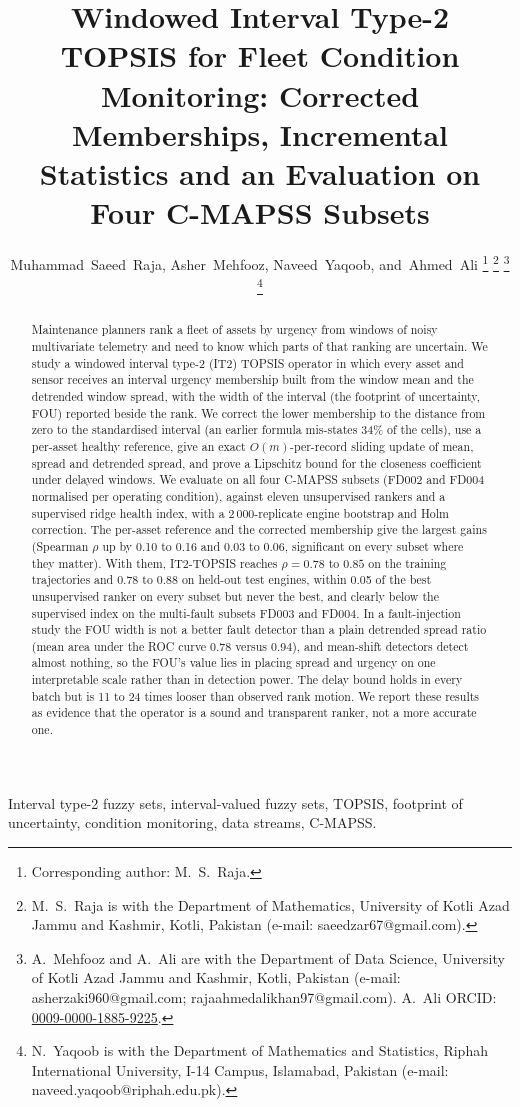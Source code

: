 \documentclass[journal,10pt,twocolumn]{IEEEtran}
\title{Windowed Interval Type-2 TOPSIS for Fleet Condition Monitoring: Corrected Memberships, Incremental Statistics and an Evaluation on Four C-MAPSS Subsets}
\author{Muhammad~Saeed~Raja,
        Asher~Mehfooz,
        Naveed~Yaqoob,
        and~Ahmed~Ali%
\thanks{Corresponding author: M.~S.~Raja.}%
\thanks{M.~S.~Raja is with the Department of Mathematics, University of Kotli Azad Jammu and Kashmir, Kotli, Pakistan (e-mail: saeedzar67@gmail.com).}%
\thanks{A.~Mehfooz and A.~Ali are with the Department of Data Science, University of Kotli Azad Jammu and Kashmir, Kotli, Pakistan (e-mail: asherzaki960@gmail.com; rajaahmedalikhan97@gmail.com). A.~Ali ORCID: \href{https://orcid.org/0009-0000-1885-9225}{0009-0000-1885-9225}.}%
\thanks{N.~Yaqoob is with the Department of Mathematics and Statistics, Riphah International University, I-14 Campus, Islamabad, Pakistan (e-mail: naveed.yaqoob@riphah.edu.pk).}}
\begin{document}
\maketitle
\begin{abstract}
Maintenance planners rank a fleet of assets by urgency from windows of noisy multivariate telemetry and need to know which parts of that ranking are uncertain. We study a windowed interval type-2 (IT2) TOPSIS operator in which every asset and sensor receives an interval urgency membership built from the window mean and the detrended window spread, with the width of the interval (the footprint of uncertainty, FOU) reported beside the rank. We correct the lower membership to the distance from zero to the standardised interval (an earlier formula mis-states 34\% of the cells), use a per-asset healthy reference, give an exact $O(m)$-per-record sliding update of mean, spread and detrended spread, and prove a Lipschitz bound for the closeness coefficient under delayed windows. We evaluate on all four C-MAPSS subsets (FD002 and FD004 normalised per operating condition), against eleven unsupervised rankers and a supervised ridge health index, with a 2\,000-replicate engine bootstrap and Holm correction. The per-asset reference and the corrected membership give the largest gains (Spearman $\rho$ up by 0.10 to 0.16 and 0.03 to 0.06, significant on every subset where they matter). With them, IT2-TOPSIS reaches $\rho=0.78$ to $0.85$ on the training trajectories and $0.78$ to $0.88$ on held-out test engines, within 0.05 of the best unsupervised ranker on every subset but never the best, and clearly below the supervised index on the multi-fault subsets FD003 and FD004. In a fault-injection study the FOU width is not a better fault detector than a plain detrended spread ratio (mean area under the ROC curve 0.78 versus 0.94), and mean-shift detectors detect almost nothing, so the FOU's value lies in placing spread and urgency on one interpretable scale rather than in detection power. The delay bound holds in every batch but is 11 to 24 times looser than observed rank motion. We report these results as evidence that the operator is a sound and transparent ranker, not a more accurate one.
\end{abstract}

\begin{IEEEkeywords}
Interval type-2 fuzzy sets, interval-valued fuzzy sets, TOPSIS, footprint of uncertainty, condition monitoring, data streams, C-MAPSS.
\end{IEEEkeywords}
\end{document}
